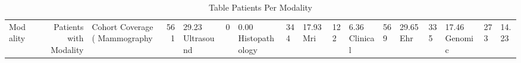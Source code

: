 \begin{table}
\caption{Table Patients Per Modality}
\begin{tabular}{lrlrl}
\toprule
Modality & Patients with Modality & Cohort Coverage (%
\midrule
Mammography & 561 & 29.23%
Ultrasound & 0 & 0.00%
Histopathology & 344 & 17.93%
Mri & 122 & 6.36%
Clinical & 569 & 29.65%
Ehr & 335 & 17.46%
Genomic & 273 & 14.23%
\bottomrule
\end{tabular}
\end{table}
